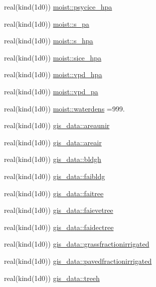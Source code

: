 \begin{DoxyCompactItemize}
\item 
real(kind(1d0)) \hyperlink{namespacemoist_a6c83d3efeb2f1e2423e18064a8935c6e}{moist\+::psycice\+\_\+hpa}
\item 
real(kind(1d0)) \hyperlink{namespacemoist_aa7e2596730c9a1b91e912106c46d11fe}{moist\+::s\+\_\+pa}
\item 
real(kind(1d0)) \hyperlink{namespacemoist_ab898e28f0ece3e6a2c1852fd8fe61bc1}{moist\+::s\+\_\+hpa}
\item 
real(kind(1d0)) \hyperlink{namespacemoist_a38df7531f904d511b341f35b56ab56f3}{moist\+::sice\+\_\+hpa}
\item 
real(kind(1d0)) \hyperlink{namespacemoist_aad393ebb822062a86d42176ac76b30ad}{moist\+::vpd\+\_\+hpa}
\item 
real(kind(1d0)) \hyperlink{namespacemoist_a86ab3b130c4af24cd94e0859a73c58e6}{moist\+::vpd\+\_\+pa}
\item 
real(kind(1d0)) \hyperlink{namespacemoist_a7d9cfae074d81f978b44ac92bf94b32b}{moist\+::waterdens} =999.
\item 
real(kind(1d0)) \hyperlink{namespacegis__data_aa03da52768d09c13ccfeb0d193f41b2e}{gis\+\_\+data\+::areaunir}
\item 
real(kind(1d0)) \hyperlink{namespacegis__data_ae687756bf9ebbc2a6b62812fa76ab008}{gis\+\_\+data\+::areair}
\item 
real(kind(1d0)) \hyperlink{namespacegis__data_a2a0cc85bf87fdf807e528acb5c7b0740}{gis\+\_\+data\+::bldgh}
\item 
real(kind(1d0)) \hyperlink{namespacegis__data_a23e18e9f568ef5a47ed3b37826c9f7f3}{gis\+\_\+data\+::faibldg}
\item 
real(kind(1d0)) \hyperlink{namespacegis__data_ae72d3a579ecf2a355591ca6eb2e69e7a}{gis\+\_\+data\+::faitree}
\item 
real(kind(1d0)) \hyperlink{namespacegis__data_a78a214dccb2ce0e8d532e514bd05927f}{gis\+\_\+data\+::faievetree}
\item 
real(kind(1d0)) \hyperlink{namespacegis__data_ae57a4a8a22280d3953006ba6e242c5be}{gis\+\_\+data\+::faidectree}
\item 
real(kind(1d0)) \hyperlink{namespacegis__data_afcf40b580d0a125cd6adbb7fd65be940}{gis\+\_\+data\+::grassfractionirrigated}
\item 
real(kind(1d0)) \hyperlink{namespacegis__data_a1eb73d51311f9f34a225b59c614c4829}{gis\+\_\+data\+::pavedfractionirrigated}
\item 
real(kind(1d0)) \hyperlink{namespacegis__data_a61372aae8e3ed0ee5389693466534169}{gis\+\_\+data\+::treeh}

\end{DoxyCompactItemize}

